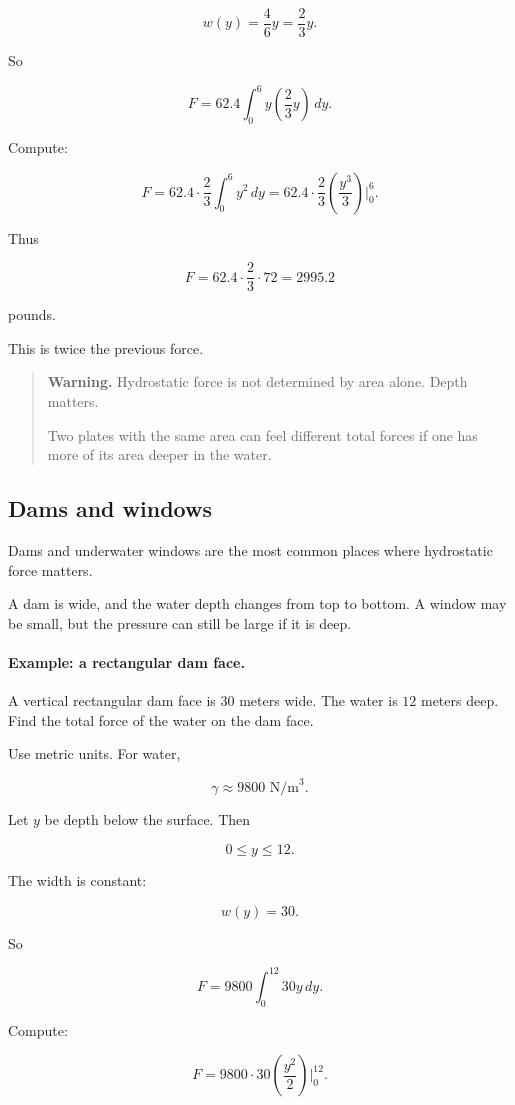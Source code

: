 \[
w(y)=\frac{4}{6}y=\frac{2}{3}y.
\]

So

\[
F=62.4\int_0^6 y\left(\frac23y\right)\,dy.
\]

Compute:

\[
F
=
62.4\cdot\frac23\int_0^6 y^2\,dy
=
62.4\cdot\frac23\left(\frac{y^3}{3}\right)\Big|_0^6.
\]

Thus

\[
F
=
62.4\cdot\frac23\cdot72
=
\boxed{2995.2}
\]

pounds.

This is twice the previous force.

\begin{quote}
\textbf{Warning.}
Hydrostatic force is not determined by area alone.  Depth matters.

Two plates with the same area can feel different total forces if one has more of its
area deeper in the water.
\end{quote}

\subsection{Dams and windows}
\label{subsec:dams-and-windows}

Dams and underwater windows are the most common places where hydrostatic force
matters.

A dam is wide, and the water depth changes from top to bottom.  A window may be
small, but the pressure can still be large if it is deep.

\paragraph{Example: a rectangular dam face.}
A vertical rectangular dam face is \(30\) meters wide.  The water is \(12\) meters deep.
Find the total force of the water on the dam face.

Use metric units.  For water,

\[
\gamma\approx9800\text{ N/m}^3.
\]

Let \(y\) be depth below the surface.  Then

\[
0\le y\le12.
\]

The width is constant:

\[
w(y)=30.
\]

So

\[
F=9800\int_0^{12} 30y\,dy.
\]

Compute:

\[
F=9800\cdot30\left(\frac{y^2}{2}\right)\Big|_0^{12}.
\]

